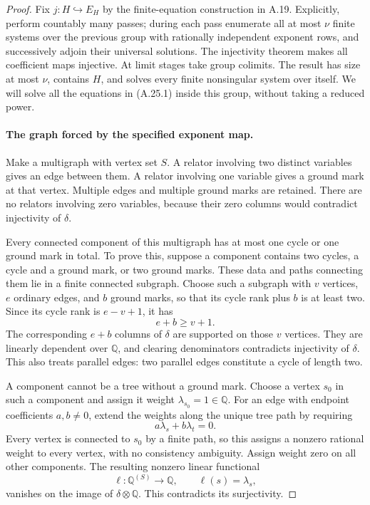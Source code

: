 \begin{proof}
Fix $j:H\hookrightarrow E_H$ by the finite-equation construction
in A.19. Explicitly, perform countably many passes; during each
pass enumerate all at most $\nu$ finite systems over the previous
group with rationally independent exponent rows, and successively
adjoin their universal solutions. The injectivity theorem
\cite[Theorem~1]{D_OpenAI2026Nonsingular} makes all coefficient
maps injective. At limit stages take group colimits. The result
has size at most $\nu$, contains $H$, and solves every finite
nonsingular system over itself. We will solve all the equations
in (A.25.1) inside this group, without taking a reduced power.

\paragraph{The graph forced by the specified exponent map.}
Make a multigraph with vertex set $S$. A relator involving two
distinct variables gives an edge between them. A relator
involving one variable gives a ground mark at that vertex.
Multiple edges and multiple ground marks are retained. There
are no relators involving zero variables, because their zero
columns would contradict injectivity of $\delta$.

Every connected component of this multigraph has at most one
cycle or one ground mark in total. To prove this, suppose a
component contains two cycles, a cycle and a ground mark, or
two ground marks. These data and paths connecting them lie
in a finite connected subgraph. Choose such a subgraph with
$v$ vertices, $e$ ordinary edges, and $b$ ground marks, so
that its cycle rank plus $b$ is at least two. Since its cycle
rank is $e-v+1$, it has
\[
 e+b\geq v+1.
\]
The corresponding $e+b$ columns of $\delta$ are supported
on those $v$ vertices. They are linearly dependent over
$\mathbb Q$, and clearing denominators contradicts
injectivity of $\delta$. This also treats parallel edges:
two parallel edges constitute a cycle of length two.

A component cannot be a tree without a ground mark. Choose
a vertex $s_0$ in such a component and assign it weight
$\lambda_{s_0}=1\in\mathbb Q$. For an edge with endpoint
coefficients $a,b\ne0$, extend the weights along the unique
tree path by requiring
\[
 a\lambda_s+b\lambda_t=0.
\]
Every vertex is connected to $s_0$ by a finite path, so this
assigns a nonzero rational weight to every vertex, with no
consistency ambiguity. Assign weight zero on all other
components. The resulting nonzero linear functional
\[
 \ell:\mathbb Q^{(S)}\longrightarrow\mathbb Q,
 \qquad \ell(s)=\lambda_s,
\]
vanishes on the image of $\delta\otimes\mathbb Q$.
This contradicts its surjectivity.


\end{proof}
